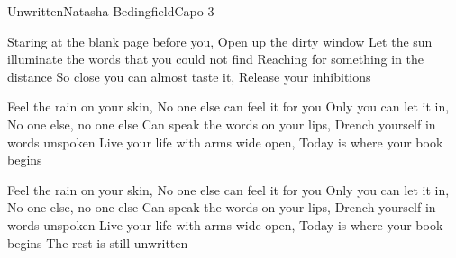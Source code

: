 \begin{song}{Unwritten}{Natasha Bedingfield}{Capo 3}

Staring at the blank page before you, Open up the dirty window
Let the sun illuminate the words that you could not find
Reaching for something in the distance
So close you can almost taste it, Release your inhibitions

Feel the rain on your skin, No one else can feel it for you
Only you can let it in, No one else, no one else
Can speak the words on your lips, Drench yourself in words unspoken
Live your life with arms wide open, Today is where your book begins

Feel the rain on your skin, No one else can feel it for you
Only you can let it in, No one else, no one else
Can speak the words on your lips, Drench yourself in words unspoken
Live your life with arms wide open, Today is where your book begins
The rest is still unwritten
\end{song}
